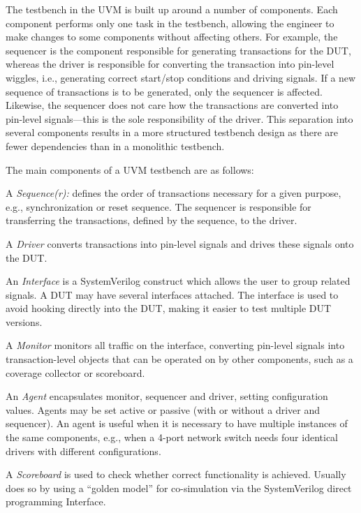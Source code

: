 \documentclass[conference]{IEEEtran}
\begin{document}
The testbench in the UVM is built up around a number of components.
Each component performs only one task in the testbench, allowing the engineer to make changes to some components without affecting others. 
For example, the sequencer is the component responsible for generating transactions for the DUT, whereas the driver is responsible for converting the transaction into pin-level wiggles, i.e., generating correct start/stop conditions and
driving signals. If a new sequence of transactions is to be generated, only the sequencer is affected. Likewise, the sequencer does not care how the transactions are converted into pin-level signals---this is the sole responsibility of the driver. This separation into several components results in a more structured testbench design as there are fewer dependencies than in a monolithic testbench.

The main components of a UVM testbench are as follows:

    A \textit{Sequence(r):} defines the order of transactions necessary for a given purpose, e.g., synchronization or reset sequence. The sequencer is responsible for transferring the transactions, defined by the sequence, to the driver.
    
    A \textit{Driver} converts transactions into pin-level signals and drives these signals onto the DUT.
    
    An \textit{Interface} is a SystemVerilog construct which allows the user to group related signals. A DUT may have several interfaces attached.
    The interface is used to avoid hooking directly into the DUT, making it easier to test multiple DUT versions.
    
    A \textit{Monitor} monitors all traffic on the interface, converting pin-level signals into transaction-level objects that can be operated on by other components, such as a coverage collector or scoreboard.
    
    An \textit{Agent} encapsulates monitor, sequencer and driver, setting configuration values. Agents may be set active or passive (with or without a driver and sequencer). An agent is useful when it is necessary to have multiple instances of the same components, e.g., when a 4-port network switch needs four identical drivers with different configurations.
    
    A \textit{Scoreboard} is used to check whether correct functionality is achieved. Usually does so by using a ``golden model'' for co-simulation via the SystemVerilog direct programming Interface.
    
\end{document}

